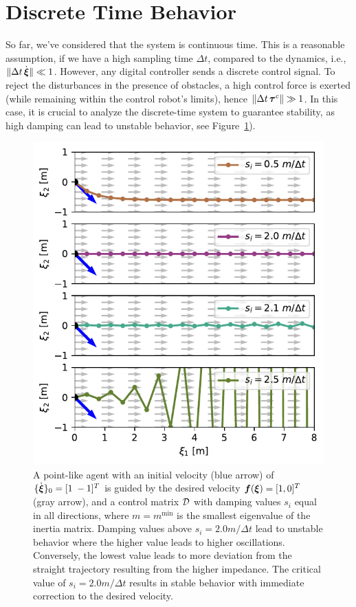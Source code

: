 \section{Discrete Time Behavior} \label{sec:discrete_time_behavior}
So far, we've considered that the system is continuous time. 
This is a reasonable assumption, if we have a high sampling time $\Delta t$, compared to the dynamics, i.e., $\| \Delta t \, \dot{\boldsymbol{\xi}} \| \ll 1$.
However, any digital controller sends a discrete control signal. To reject the disturbances in the presence of obstacles, a high control force is exerted (while remaining within the control robot's limits), hence $\| \Delta t \, \boldsymbol{\tau}^c \| \gg 1$. 
In this case, it is crucial to analyze the discrete-time system to guarantee stability, as high damping can lead to unstable behavior, see Figure~\ref{fig:discrete_controller_parameters_comparison}).

\begin{figure}[htb]
\centering
  \includegraphics[width=\columnwidth]{figures/discrete_controller_parameters_comparison}
  \caption{A point-like agent with an initial velocity (blue arrow) of $\{ \dot{\boldsymbol{\xi}} \}_0 = [1 \; -1]^T$ is guided by the desired velocity $\boldsymbol{f}(\boldsymbol{\xi}) = [1, 0]^T$ (gray arrow), and a control matrix $\mathcal{D}$ with damping values $s_i$ equal in all directions, where $m = m^{\mathrm{min}}$ is the smallest eigenvalue of the inertia matrix. 
  Damping values above $s_i = 2.0 m / \Delta t$ lead to unstable behavior where the higher value leads to higher oscillations. Conversely, the lowest value leads to more deviation from the straight trajectory resulting from the higher impedance. The critical value of $s_i = 2.0 m / \Delta t$ results in stable behavior with immediate correction to the desired velocity.}
  \label{fig:discrete_controller_parameters_comparison}
\end{figure}

